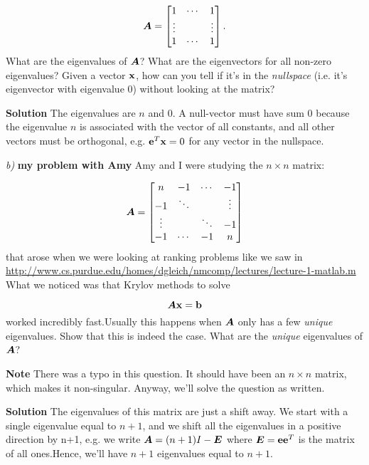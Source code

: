 \documentclass{article}
\begin{document}
\begin{displaymath}
\boldsymbol{A} = \begin{bmatrix}  1 & \cdots & 1 \\                \vdots & & \vdots \\
                1 & \cdots & 1  \end{bmatrix}.
\end{displaymath}
What are the eigenvalues of $\boldsymbol{A}$? What are the eigenvectors for all non-zero eigenvalues? Given a vector $\boldsymbol{\mathrm{x}}$, how can you tell if it'{}s in the \emph{nullspace} (i.e. it'{}s eigenvector with eigenvalue 0) without looking at the matrix?

\textbf{Solution} The eigenvalues are $n$ and $0$. A null-vector must have sum 0 because the eigenvalue $n$ is associated with the vector of all constants, and all other vectors must be orthogonal, e.g. $\boldsymbol{\mathrm{e}}^T \boldsymbol{\mathrm{x}} = 0$ for any vector in the nullspace.

\emph{b)} \textbf{my problem with Amy} Amy and I were studying the $n \times n$ matrix:

\begin{displaymath}
\boldsymbol{A} = \begin{bmatrix}  n & -1 & \cdots & -1 \\                -1 & \ddots & & \vdots \\
                \vdots & & \ddots & -1 \\
                -1 & \cdots & -1 & n  \end{bmatrix}
\end{displaymath}
that arose when we were looking at ranking problems like we saw in \url{http://www.cs.purdue.edu/homes/dgleich/nmcomp/lectures/lecture-1-matlab.m} What we noticed was that Krylov methods to solve

\begin{displaymath}
\boldsymbol{A} \boldsymbol{\mathrm{x}} = \boldsymbol{\mathrm{b}}
\end{displaymath}
worked incredibly fast.\newline Usually this happens when $\boldsymbol{A}$ only has a few \emph{unique} eigenvalues. Show that this is indeed the case. What are the \emph{unique} eigenvalues of $\boldsymbol{A}$?

\textbf{Note} There was a typo in this question. It should have been an $n \times n$ matrix, which makes it non-singular. Anyway, we'{}ll solve the question as written.

\textbf{Solution} The eigenvalues of this matrix are just a shift away. We start with a single eigenvalue equal to $n+1$, and we shift all the eigenvalues in a positive direction by n+1, e.g. we write $\boldsymbol{A} = (n+1) I - \boldsymbol{E}$ where $\boldsymbol{E}=\boldsymbol{\mathrm{e}}\boldsymbol{\mathrm{e}}^T$ is the matrix of all ones.\newline Hence, we'{}ll have $n+1$ eigenvalues equal to $n+1$.
\end{document}
